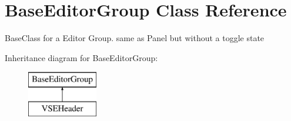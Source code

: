 \hypertarget{class_base_editor_group}{}\section{Base\+Editor\+Group Class Reference}
\label{class_base_editor_group}


Base\+Class for a Editor Group. same as Panel but without a toggle state  


Inheritance diagram for Base\+Editor\+Group\+:\begin{figure}[H]
\begin{center}
\leavevmode
\includegraphics[height=2.000000cm]{class_base_editor_group}
\end{center}
\end{figure}
